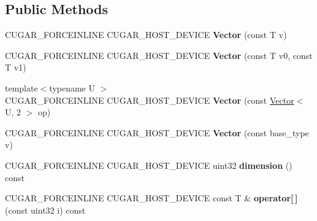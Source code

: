 \subsection*{Public Methods}
\begin{DoxyCompactItemize}
\item 
\mbox{\label{structcugar_1_1_vector_3_01_t_00_012_01_4_a79a0bae8c82bd5814a8505d371ae3eac}} 
C\+U\+G\+A\+R\+\_\+\+F\+O\+R\+C\+E\+I\+N\+L\+I\+NE C\+U\+G\+A\+R\+\_\+\+H\+O\+S\+T\+\_\+\+D\+E\+V\+I\+CE {\bfseries Vector} (const T v)
\item 
\mbox{\label{structcugar_1_1_vector_3_01_t_00_012_01_4_ad0d87ffd878cb14fd83f7da9da79bb65}} 
C\+U\+G\+A\+R\+\_\+\+F\+O\+R\+C\+E\+I\+N\+L\+I\+NE C\+U\+G\+A\+R\+\_\+\+H\+O\+S\+T\+\_\+\+D\+E\+V\+I\+CE {\bfseries Vector} (const T v0, const T v1)
\item 
\mbox{\label{structcugar_1_1_vector_3_01_t_00_012_01_4_a9d467bee0532eb6e28921033dc7ac116}} 
{\footnotesize template$<$typename U $>$ }\\C\+U\+G\+A\+R\+\_\+\+F\+O\+R\+C\+E\+I\+N\+L\+I\+NE C\+U\+G\+A\+R\+\_\+\+H\+O\+S\+T\+\_\+\+D\+E\+V\+I\+CE {\bfseries Vector} (const \hyperlink{structcugar_1_1_vector}{Vector}$<$ U, 2 $>$ op)
\item 
\mbox{\label{structcugar_1_1_vector_3_01_t_00_012_01_4_a9170486fb30f66e1bacc38ffa675219f}} 
C\+U\+G\+A\+R\+\_\+\+F\+O\+R\+C\+E\+I\+N\+L\+I\+NE C\+U\+G\+A\+R\+\_\+\+H\+O\+S\+T\+\_\+\+D\+E\+V\+I\+CE {\bfseries Vector} (const base\+\_\+type v)
\item 
\mbox{\label{structcugar_1_1_vector_3_01_t_00_012_01_4_ad6eca2513e782af50bbf948c341b2c4a}} 
C\+U\+G\+A\+R\+\_\+\+F\+O\+R\+C\+E\+I\+N\+L\+I\+NE C\+U\+G\+A\+R\+\_\+\+H\+O\+S\+T\+\_\+\+D\+E\+V\+I\+CE uint32 {\bfseries dimension} () const
\item 
\mbox{\label{structcugar_1_1_vector_3_01_t_00_012_01_4_a4b1aaf91f1760ac6030563ea920e5509}} 
C\+U\+G\+A\+R\+\_\+\+F\+O\+R\+C\+E\+I\+N\+L\+I\+NE C\+U\+G\+A\+R\+\_\+\+H\+O\+S\+T\+\_\+\+D\+E\+V\+I\+CE const T \& {\bfseries operator\mbox{[}$\,$\mbox{]}} (const uint32 i) const

\end{DoxyCompactItemize}
